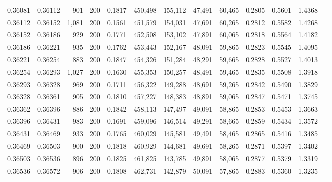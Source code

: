 \begin{tabular}{rrrrrrrrrrrrr}
0.36081 & 0.36112 &   901 & 200 &                                     0.1817 & 450,498 & 155,112 &  47,491 &  60,465 & 0.2805 & 0.5601 & 1.4368 \\
0.36112 & 0.36152 & 1,081 & 200 &                                     0.1561 & 451,579 & 154,031 &  47,691 &  60,265 & 0.2812 & 0.5582 & 1.4268 \\
0.36152 & 0.36186 &   929 & 200 &                                     0.1771 & 452,508 & 153,102 &  47,891 &  60,065 & 0.2818 & 0.5564 & 1.4182 \\
0.36186 & 0.36221 &   935 & 200 &                                     0.1762 & 453,443 & 152,167 &  48,091 &  59,865 & 0.2823 & 0.5545 & 1.4095 \\
0.36221 & 0.36254 &   883 & 200 &                                     0.1847 & 454,326 & 151,284 &  48,291 &  59,665 & 0.2828 & 0.5527 & 1.4013 \\
0.36254 & 0.36293 & 1,027 & 200 &                                     0.1630 & 455,353 & 150,257 &  48,491 &  59,465 & 0.2835 & 0.5508 & 1.3918 \\
0.36293 & 0.36328 &   969 & 200 &                                     0.1711 & 456,322 & 149,288 &  48,691 &  59,265 & 0.2842 & 0.5490 & 1.3829 \\
0.36328 & 0.36361 &   905 & 200 &                                     0.1810 & 457,227 & 148,383 &  48,891 &  59,065 & 0.2847 & 0.5471 & 1.3745 \\
0.36362 & 0.36396 &   886 & 200 &                                     0.1842 & 458,113 & 147,497 &  49,091 &  58,865 & 0.2853 & 0.5453 & 1.3663 \\
0.36396 & 0.36431 &   983 & 200 &                                     0.1691 & 459,096 & 146,514 &  49,291 &  58,665 & 0.2859 & 0.5434 & 1.3572 \\
0.36431 & 0.36469 &   933 & 200 &                                     0.1765 & 460,029 & 145,581 &  49,491 &  58,465 & 0.2865 & 0.5416 & 1.3485 \\
0.36469 & 0.36503 &   900 & 200 &                                     0.1818 & 460,929 & 144,681 &  49,691 &  58,265 & 0.2871 & 0.5397 & 1.3402 \\
0.36503 & 0.36536 &   896 & 200 &                                     0.1825 & 461,825 & 143,785 &  49,891 &  58,065 & 0.2877 & 0.5379 & 1.3319 \\
0.36536 & 0.36572 &   906 & 200 &                                     0.1808 & 462,731 & 142,879 &  50,091 &  57,865 & 0.2883 & 0.5360 & 1.3235 \\

\end{tabular}
